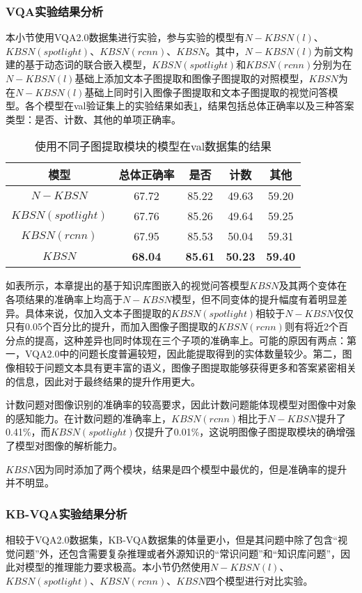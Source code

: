 \subsubsection{VQA实验结果分析}
本小节使用VQA2.0数据集进行实验，参与实验的模型有$N-KBSN(l)$、$KBSN(spotlight)$、$KBSN(rcnn)$、$KBSN$。其中，$N-KBSN(l)$为前文构建的基于动态词的联合嵌入模型，$KBSN(spotlight)$和$KBSN(rcnn)$分别为在$N-KBSN(l)$基础上添加文本子图提取和图像子图提取的对照模型，$KBSN$为在$N-KBSN(l)$基础上同时引入图像子图提取和文本子图提取的视觉问答模型。各个模型在val验证集上的实验结果如表\ref{4modelres}，结果包括总体正确率以及三种答案类型：是否、计数、其他的单项正确率。
\begin{table}[H]
\centering
\caption{使用不同子图提取模块的模型在val数据集的结果}
\begin{tabular}{ccccc}
\toprule
模型 & 总体正确率 & 是否 & 计数 & 其他\\
\midrule
$N-KBSN$& 67.72 & 85.22 & 49.63 & 59.20\\
\midrule
$KBSN(spotlight)$&  67.76& 85.26&  49.64& 59.25\\
$KBSN(rcnn)$&  67.95& 85.53&  50.04& 59.31\\
$KBSN$&  \textbf{68.04}& \textbf{85.61}&  \textbf{50.23}& \textbf{59.40}\\
\bottomrule
\end{tabular}
\label{4modelres}
\end{table}

如表所示，本章提出的基于知识库图嵌入的视觉问答模型$KBSN$及其两个变体在各项结果的准确率上均高于$N-KBSN$模型，但不同变体的提升幅度有着明显差异。具体来说，仅加入文本子图提取的$KBSN(spotlight)$相较于$N-KBSN$仅仅只有0.05个百分比的提升，而加入图像子图提取的$KBSN(rcnn)$则有将近2个百分点的提高，这种差异也同时体现在三个子项的准确率上。可能的原因有两点：第一，VQA2.0中的问题长度普遍较短，因此能提取得到的实体数量较少。第二，图像相较于问题文本具有更丰富的语义，图像子图提取能够获得更多和答案紧密相关的信息，因此对于最终结果的提升作用更大。

计数问题对图像识别的准确率的较高要求，因此计数问题能体现模型对图像中对象的感知能力。在计数问题的准确率上，$KBSN(rcnn)$相比于$N-KBSN$提升了0.41\%，而$KBSN(spotlight)$仅提升了0.01\%，这说明图像子图提取模块的确增强了模型对图像的解析能力。

$KBSN$因为同时添加了两个模块，结果是四个模型中最优的，但是准确率的提升并不明显。

\subsubsection{KB-VQA实验结果分析}
相较于VQA2.0数据集，KB-VQA数据集的体量更小，但是其问题中除了包含“视觉问题”外，还包含需要复杂推理或者外源知识的“常识问题”和“知识库问题”，因此对模型的推理能力要求极高。本小节仍然使用$N-KBSN(l)$、$KBSN(spotlight)$、$KBSN(rcnn)$、$KBSN$四个模型进行对比实验。

